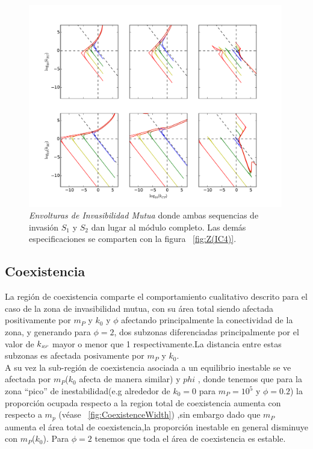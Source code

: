 \begin{figure}
  \centering
  \includegraphics[width = 0.99\textwidth]{./Plots/MutualInvAcGrGr.pdf}
  \caption[Env $I_M$]{\emph{Envolturas de Invasibilidad Mutua} donde ambas sequencias de invasi\'on $S_1$ y $S_2$ dan lugar al m\'odulo completo. Las dem\'as especificaciones se comparten con la figura ~\ref{fig:Z(IC4)}.}
  \label{fig:MutualInv}
\end{figure}

\subsection{Coexistencia}

La regi\'on de coexistencia comparte el comportamiento cualitativo descrito para el caso de la zona de invasibilidad mutua, con su \'area total siendo afectada positivamente por $m_P$ y $k_0$ y $\phi$ afectando principalmente la conectividad de la zona, y generando para $\phi = 2$, dos subzonas diferenciadas principalmente por el valor de $k_{\textit{\tiny RP}}$ mayor o menor que 1 respectivamente.La distancia entre estas subzonas es afectada posivamente por $m_P$ y $k_0$. \\

A su vez la sub-regi\'on de coexistencia asociada a un equilibrio inestable se ve afectada por $m_P$($k_0$ afecta de manera similar) y $phi$ , donde tenemos que para la zona ``pico'' de inestabilidad(e.g alrededor de $k_0 = 0$ para $m_P = 10^5$ y $\phi = 0.2$) la proporci\'on ocupada respecto a la region total de coexistencia aumenta con respecto a $m_p$ (v\'ease ~\ref{fig:CoexistenceWidth}) ,sin embargo dado que $m_P$ aumenta el \'area total de coexistencia,la proporci\'on inestable en general disminuye con $m_P$($k_0$). Para $\phi = 2$ tenemos que toda el \'area de coexistencia es estable.

